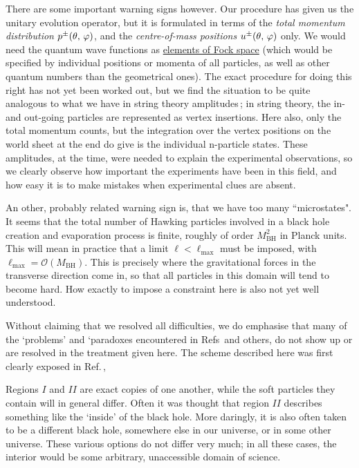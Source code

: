 \documentclass[12pt]{article}
\def\OO{{\mathcal O}} 	\def\DD{{\mathcal D}}	     \def\ZZ{\mathbb{Z}}
\def\BH{{\mathrm{BH}}}\def\Pl{{\mathrm{Pl}}}\def\inn{{\mathrm{in}}} \def\outt{{\mathrm{out}}}
\begin{document}
There are some important warning signs however.  Our procedure has given us the unitary evolution operator, but it is formulated in terms of the \emph{total momentum distribution} \(p^\pm(\theta,\,\varphi)\), and the \emph{centre-of-mass positions} \(u^\pm(\theta,\,\varphi)\) only. We would need the quantum wave functions as \ul{elements of Fock space} (which would be specified by individual positions or momenta of all particles, as well as other quantum numbers than the geometrical ones). The exact procedure for doing this right has not yet been worked out, but we find the situation to be quite analogous to what we have in string theory amplitudes\,\cite{GtHstrings1, GtHstrings2}; in string theory, the in- and out-going particles are represented as vertex insertions. Here also, only the total momentum counts, but the integration over the vertex positions on the world sheet at the end do give is the individual n-particle states. These amplitudes, at the time, were needed to explain the experimental observations, so we clearly observe how important the experiments have been in this field, and how easy it is to make mistakes when experimental clues are absent.

An other, probably related warning sign is, that we have too many ``microstates". It seems that the total number of Hawking particles involved in a black hole creation and evaporation process is finite, roughly of order \(M_\BH^2\) in Planck units. This will mean in practice that a limit \(\ell<\ell_{\mathrm{max}}\) must be imposed, with \(\ell_{\mathrm{max}}=\OO(M_\BH)\). This is precisely where the gravitational  forces in the transverse direction come in, so that all particles in this domain will tend to become hard. How exactly to impose a constraint here is also not yet well understood.

Without claiming that we resolved all difficulties, we do emphasise that many of the `problems' and `paradoxes encountered in Refs\,\cite{firewall, Giddings1, Polch, Giddings4} and others, do not show up or are resolved  in the treatment given here. The scheme described here was first clearly exposed in Ref.\,\cite{GtHrecent1},




Regions \(I\) and \(II\) are exact copies of one another, while the soft particles they contain will in general differ. Often it was thought that region \(II\) describes something like the `inside' of the black hole. More daringly, it is also often taken to be a different black hole, somewhere else in our universe,  or in some other universe. These various options do not differ very much; in all these cases, the interior would be some arbitrary, unaccessible domain of science.
\end{document}

